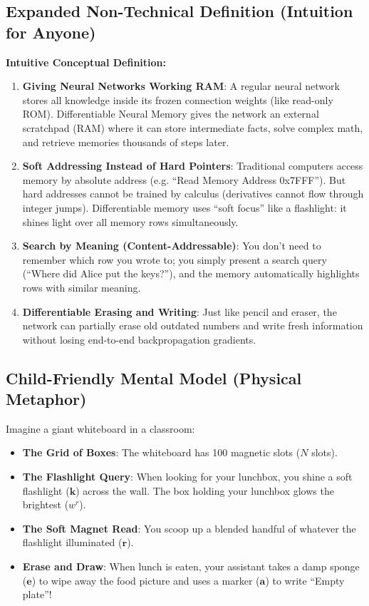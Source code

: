 \documentclass[11pt,a4paper]{article}
\theoremstyle{definition}
\begin{document}
\subsection{Expanded Non-Technical Definition (Intuition for Anyone)}
\textbf{Intuitive Conceptual Definition:}
\begin{enumerate}
    \item \textbf{Giving Neural Networks Working RAM}: A regular neural network stores all knowledge inside its frozen connection weights (like read-only ROM). Differentiable Neural Memory gives the network an external scratchpad (RAM) where it can store intermediate facts, solve complex math, and retrieve memories thousands of steps later.
    \item \textbf{Soft Addressing Instead of Hard Pointers}: Traditional computers access memory by absolute address (e.g. ``Read Memory Address 0x7FFF''). But hard addresses cannot be trained by calculus (derivatives cannot flow through integer jumps). Differentiable memory uses ``soft focus'' like a flashlight: it shines light over all memory rows simultaneously.
    \item \textbf{Search by Meaning (Content-Addressable)}: You don't need to remember which row you wrote to; you simply present a search query (``Where did Alice put the keys?''), and the memory automatically highlights rows with similar meaning.
    \item \textbf{Differentiable Erasing and Writing}: Just like pencil and eraser, the network can partially erase old outdated numbers and write fresh information without losing end-to-end backpropagation gradients.
\end{enumerate}

\subsection{Child-Friendly Mental Model (Physical Metaphor)}
Imagine a giant whiteboard in a classroom:
\begin{itemize}
    \item \textbf{The Grid of Boxes}: The whiteboard has 100 magnetic slots ($N$ slots).
    \item \textbf{The Flashlight Query}: When looking for your lunchbox, you shine a soft flashlight ($\mathbf{k}$) across the wall. The box holding your lunchbox glows the brightest ($w^r$).
    \item \textbf{The Soft Magnet Read}: You scoop up a blended handful of whatever the flashlight illuminated ($\mathbf{r}$).
    \item \textbf{Erase and Draw}: When lunch is eaten, your assistant takes a damp sponge ($\mathbf{e}$) to wipe away the food picture and uses a marker ($\mathbf{a}$) to write ``Empty plate''!
\end{itemize}
\end{document}
